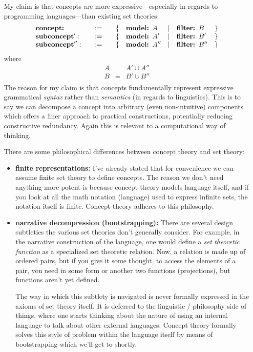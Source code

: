 \documentclass[twoside]{article}
\newcommand{\bfmbox}[1]{\mbox{\bfseries #1}}
\begin{document}
My claim is that concepts are more expressive---especially in regards to programming languages---than existing set theories:
$$ \begin{array}{lcllcll}
\bfmbox{concept:} \quad & := \quad & \{ &  \bfmbox{model: } A & | & \bfmbox{filter: } B & \}		\\
\bfmbox{subconcept}': \quad & := \quad & \{ & \bfmbox{model: } A' & | & \bfmbox{filter: } B' & \}	\\
\bfmbox{subconcept}'': \quad & := \quad & \{ & \bfmbox{model: } A'' & | & \bfmbox{filter: } B'' & \}	\\
\end{array} $$
where
$$ \begin{array}{rcl}
A & = & A'\cup A''		\\
B & = & B'\cup B''		\\
\end{array} $$
The reason for my claim is that concepts fundamentally represent expressive grammatical \emph{syntax} rather than
\emph{semantics} (in regards to linguistics). This is to say we can decompose a concept into arbitrary (even non-intuitive)
components which offers a finer approach to practical constructions, potentially reducing constructive redundancy.
Again this is relevant to a computational way of thinking.

\newpage

There are some philosophical differences between concept theory and set theory:
\begin{itemize}
\item {\bfseries finite representations:} I've already stated that for convenience we can assume finite set theory to define
concepts. The reason we don't need anything more potent is because concept theory models language itself, and if you look at
all the math notation (language) used to express infinite sets, the notation itself is finite. Concept theory adheres to
this philosophy.
\item {\bfseries narrative decompression (bootstrapping):} There are several design subtleties the various set theories
don't generally consider. For example, in the narrative construction of the language, one would define a
\emph{set theoretic function} as a specialized set theoretic relation. Now, a relation is made up of ordered pairs,
but if you give it some thought, to access the elements of a pair, you need in some form or another two functions
(projections), but functions aren't yet defined.

The way in which this subtlety is navigated is never formally expressed in the axioms of set theory itself. It is deferred
to the linguistic / philosophy side of things, where one starts thinking about the nature of using an internal language to
talk about other external languages. Concept theory formally solves this style of problem within the language itself
by means of bootstrapping which we'll get to shortly.
\end{itemize}
\end{document}
